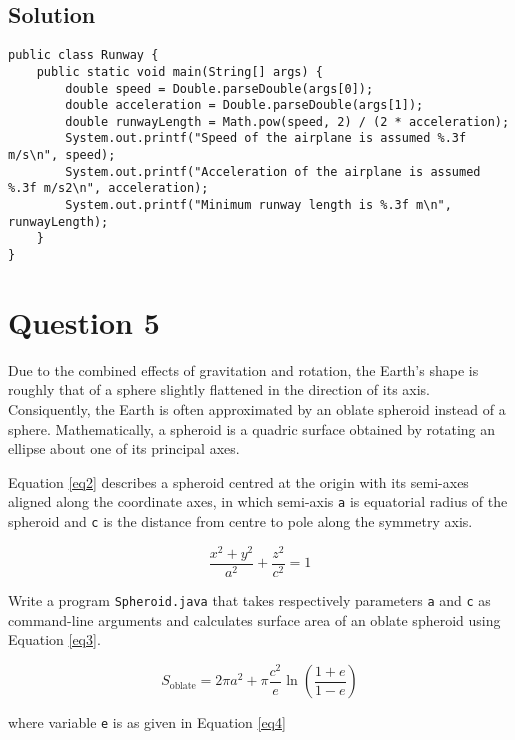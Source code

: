 \documentclass[12pt,letterpaper,twoside]{article}
\begin{document}
\subsection*{Solution}

\lstset{language=Java,tabsize=2}
\begin{lstlisting}
public class Runway {
	public static void main(String[] args) {
		double speed = Double.parseDouble(args[0]);
		double acceleration = Double.parseDouble(args[1]);
		double runwayLength = Math.pow(speed, 2) / (2 * acceleration);
		System.out.printf("Speed of the airplane is assumed %.3f m/s\n", speed);
		System.out.printf("Acceleration of the airplane is assumed %.3f m/s2\n", acceleration);
		System.out.printf("Minimum runway length is %.3f m\n", runwayLength);
	}
}
\end{lstlisting}

\section*{Question 5}

Due to the combined effects of gravitation and rotation, the Earth's shape is roughly that of a sphere slightly flattened in the direction of its axis. Consiquently, the Earth is often approximated by an oblate spheroid instead of a sphere. Mathematically, a spheroid is a quadric surface obtained by rotating an ellipse about one of its principal axes.

Equation \ref{eq2} describes a spheroid centred at the origin with its semi-axes aligned along the coordinate axes, in which semi-axis \texttt{a} is equatorial radius of the spheroid and \texttt{c} is the distance from centre to pole along the symmetry axis.

\begin{equation}
\frac{x^2+y^2}{a^2} + \frac{z^2}{c^2} = 1
\label{eq2}
\end{equation}

Write a program \texttt{Spheroid.java} that takes respectively parameters \texttt{a} and \texttt{c} as command-line arguments and calculates surface area of an oblate spheroid using Equation \ref{eq3}.

\begin{equation}
S_{\text{oblate}} = 2\pi a^2 + \pi \frac{c^2}{e} \ln \left(\frac{1+e}{1-e} \right)
\label{eq3}
\end{equation}

where variable \texttt{e} is as given in Equation \ref{eq4}
\end{document}
